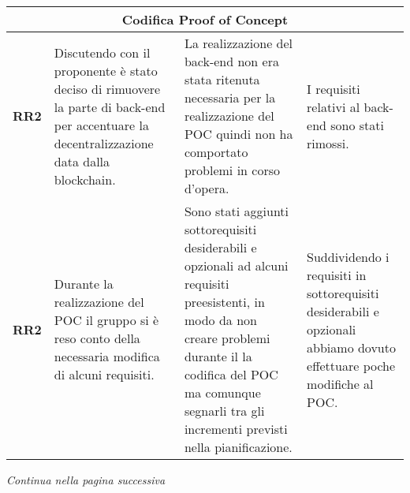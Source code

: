 \begin{table}[H]
\begin{tabular}{c|p{5cm}|p{5cm}|p{5cm}}
    \multicolumn{4}{c}{\textbf{Codifica Proof of Concept}}                                                                                                                                                                                                                                                                                                                                                                                                                                                                                                                                               \\
    \hline
    \textbf{RR2} & Discutendo con il proponente è stato deciso di rimuovere la parte di back-end per accentuare la decentralizzazione data dalla blockchain\glo{}. & La realizzazione del back-end non era stata ritenuta necessaria per la realizzazione del POC quindi non ha comportato problemi in corso d'opera.                                                                                   & I requisiti relativi al back-end sono stati rimossi.                                                                                                                                           \\
    \textbf{RR2} & Durante la realizzazione del POC il gruppo si è reso conto della necessaria modifica di alcuni requisiti.                                       & Sono stati aggiunti sottorequisiti desiderabili e opzionali ad alcuni requisiti preesistenti, in modo da non creare problemi durante il la codifica del POC ma comunque segnarli tra gli incrementi previsti nella pianificazione. & Suddividendo i requisiti in sottorequisiti desiderabili e opzionali abbiamo dovuto effettuare poche modifiche al POC.                                                                          \\
    \hline
  \end{tabular}
\end{table}
\begin{center}
  \textit{\small Continua nella pagina successiva}
\end{center}
